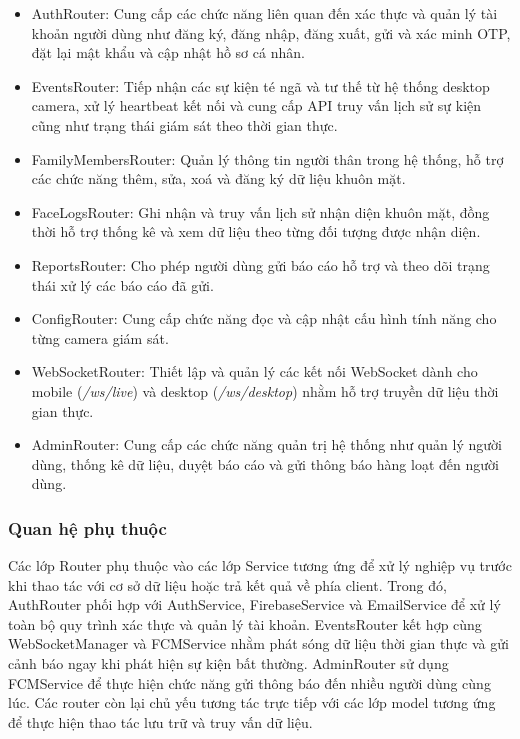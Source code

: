\begin{itemize}
\item AuthRouter: Cung cấp các chức năng liên quan đến xác thực và quản lý tài khoản người dùng như đăng ký, đăng nhập, đăng xuất, gửi và xác minh OTP, đặt lại mật khẩu và cập nhật hồ sơ cá nhân.

\item EventsRouter: Tiếp nhận các sự kiện té ngã và tư thế từ hệ thống desktop camera, xử lý heartbeat kết nối và cung cấp API truy vấn lịch sử sự kiện cũng như trạng thái giám sát theo thời gian thực.

\item FamilyMembersRouter: Quản lý thông tin người thân trong hệ thống, hỗ trợ các chức năng thêm, sửa, xoá và đăng ký dữ liệu khuôn mặt.

\item FaceLogsRouter: Ghi nhận và truy vấn lịch sử nhận diện khuôn mặt, đồng thời hỗ trợ thống kê và xem dữ liệu theo từng đối tượng được nhận diện.

\item ReportsRouter: Cho phép người dùng gửi báo cáo hỗ trợ và theo dõi trạng thái xử lý các báo cáo đã gửi.

\item ConfigRouter: Cung cấp chức năng đọc và cập nhật cấu hình tính năng cho từng camera giám sát.

\item WebSocketRouter: Thiết lập và quản lý các kết nối WebSocket dành cho mobile (\textit{/ws/live}) và desktop (\textit{/ws/desktop}) nhằm hỗ trợ truyền dữ liệu thời gian thực.

\item AdminRouter: Cung cấp các chức năng quản trị hệ thống như quản lý người dùng, thống kê dữ liệu, duyệt báo cáo và gửi thông báo hàng loạt đến người dùng.

\end{itemize}

\subsubsection*{Quan hệ phụ thuộc}

Các lớp Router phụ thuộc vào các lớp Service tương ứng để xử lý nghiệp vụ trước khi thao tác với cơ sở dữ liệu hoặc trả kết quả về phía client. Trong đó, AuthRouter phối hợp với AuthService, FirebaseService và EmailService để xử lý toàn bộ quy trình xác thực và quản lý tài khoản. EventsRouter kết hợp cùng WebSocketManager và FCMService nhằm phát sóng dữ liệu thời gian thực và gửi cảnh báo ngay khi phát hiện sự kiện bất thường. AdminRouter sử dụng FCMService để thực hiện chức năng gửi thông báo đến nhiều người dùng cùng lúc. Các router còn lại chủ yếu tương tác trực tiếp với các lớp model tương ứng để thực hiện thao tác lưu trữ và truy vấn dữ liệu.

